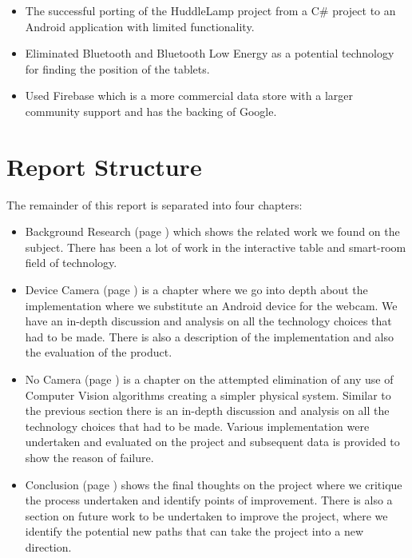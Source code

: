 \begin{itemize}
\item The successful porting of the HuddleLamp project from a C\# project to an Android application with limited functionality.
\item Eliminated Bluetooth and Bluetooth Low Energy as a potential technology for finding the position of the tablets.
\item Used Firebase which is a more commercial data store with a larger community support and has the backing of Google.
\end{itemize}

\section{Report Structure}

The remainder of this report is separated into four chapters:
\begin{itemize}
\item Background Research (page \pageref{ch:background}) which shows the related work we found on the subject. There has been a lot of work in the interactive table and smart-room field of technology.
\item Device Camera (page \pageref{ch:devcamera}) is a chapter where we go into depth about the implementation where we substitute an Android device for the webcam. We have an in-depth discussion and analysis on all the technology choices that had to be made. There is also a description of the implementation and also the evaluation of the product.
\item No Camera (page \pageref{ch:no_camera}) is a chapter on the attempted elimination of any use of Computer Vision algorithms creating a simpler physical system. Similar to the previous section there is an in-depth discussion and analysis on all the technology choices that had to be made. Various implementation were undertaken and evaluated on the project and subsequent data is provided to show the reason of failure.
\item Conclusion (page \pageref{ch:conclusions}) shows the final thoughts on the project where we critique the process undertaken and identify points of improvement. There is also a section on future work to be undertaken to improve the project, where we identify the potential new paths that can take the project into a new direction. 
\end{itemize}

